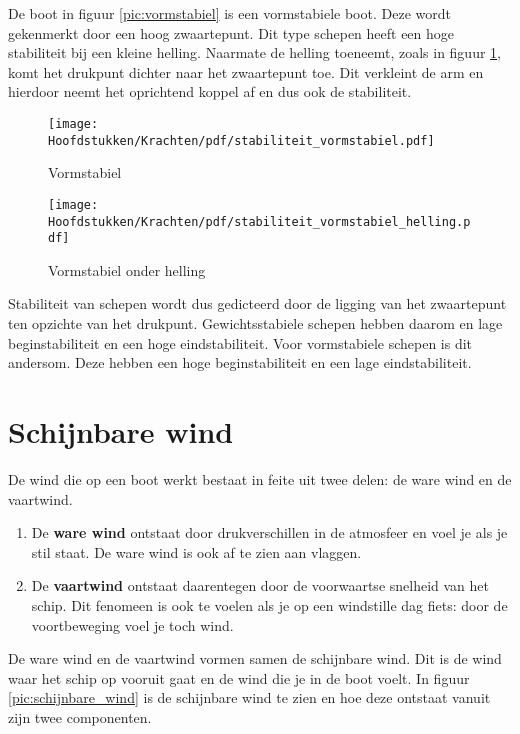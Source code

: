 De boot in figuur \ref{pic:vormstabiel} is een vormstabiele boot. Deze wordt gekenmerkt door een hoog zwaartepunt. Dit type schepen heeft een hoge stabiliteit bij een kleine helling. Naarmate de helling toeneemt, zoals in figuur \ref{pic:vormstabiel_helling}, komt het drukpunt dichter naar het zwaartepunt toe. Dit verkleint de arm en hierdoor neemt het oprichtend koppel af en dus ook de stabiliteit.
\begin{figure}[H]
	\centering
	\begin{minipage}[b]{0.49\textwidth}
		\centering
		\texttt{[image: Hoofdstukken/Krachten/pdf/stabiliteit\_vormstabiel.pdf]}
		\caption{Vormstabiel}
		\label{pic:vormstabiel}
	\end{minipage}
	\hfill
	\begin{minipage}[b]{0.49\textwidth}
		\centering
		\texttt{[image: Hoofdstukken/Krachten/pdf/stabiliteit\_vormstabiel\_helling.pdf]}
		\caption{Vormstabiel onder helling}
		\label{pic:vormstabiel_helling}
	\end{minipage}
\end{figure}

Stabiliteit van schepen wordt dus gedicteerd door de ligging van het zwaartepunt ten opzichte van het drukpunt. Gewichtsstabiele schepen hebben daarom en lage beginstabiliteit en een hoge eindstabiliteit. Voor vormstabiele schepen is dit andersom. Deze hebben een hoge beginstabiliteit en een lage eindstabiliteit.  

\newpage
\section{Schijnbare wind}
De wind die op een boot werkt bestaat in feite uit twee delen: de ware wind en de vaartwind.

\begin{enumerate}
	\item De \textbf{ware wind} ontstaat door drukverschillen in de atmosfeer en voel je als je stil staat. De ware wind is ook af te zien aan vlaggen. 
	\item De \textbf{vaartwind} ontstaat daarentegen door de voorwaartse snelheid van het schip. Dit fenomeen is ook te voelen als je op een windstille dag fiets: door de voortbeweging voel je toch wind. 
\end{enumerate}

De ware wind en de vaartwind vormen samen de schijnbare wind. Dit is de wind waar het schip op vooruit gaat en de wind die je in de boot voelt. In figuur \ref{pic:schijnbare_wind} is de schijnbare wind te zien en hoe deze ontstaat vanuit zijn twee componenten. 

